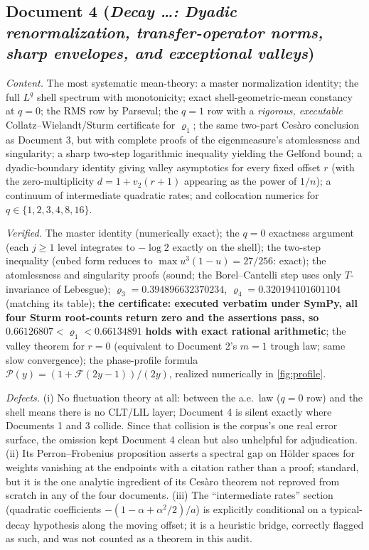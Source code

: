 \documentclass[11pt,oneside]{article}
\theoremstyle{definition}
\theoremstyle{remark}
\newcommand{\vtwo}{v_2}
\begin{document}
\subsection{Document 4 (\emph{Decay \dots: Dyadic renormalization,
transfer-operator norms, sharp envelopes, and exceptional valleys})}

\emph{Content.}  The most systematic mean-theory: a master normalization
identity; the full $L^q$ shell spectrum with monotonicity; exact
shell-geometric-mean constancy at $q=0$; the RMS row by Parseval; the
$q=1$ row with a \emph{rigorous, executable} Collatz--Wielandt/Sturm
certificate for $\varrho_1$; the same two-part Ces\`aro conclusion as
Document 3, but with complete proofs of the eigenmeasure's atomlessness
and singularity; a sharp two-step logarithmic inequality yielding the
Gelfond bound; a dyadic-boundary identity giving valley asymptotics for
every fixed offset $r$ (with the zero-multiplicity $d=1+\vtwo(r+1)$
appearing as the power of $1/n$); a continuum of intermediate quadratic
rates; and collocation numerics for $q\in\{1,2,3,4,8,16\}$.

\emph{Verified.}  The master identity (numerically exact); the $q=0$
exactness argument (each $j\ge1$ level integrates to $-\log2$ exactly on
the shell); the two-step inequality (cubed form reduces to
$\max u^3(1-u)=27/256$: exact); the atomlessness and singularity proofs
(sound; the Borel--Cantelli step uses only $T$-invariance of Lebesgue);
$\varrho_3=0.394896632370234$, $\varrho_4=0.320194101601104$ (matching
its table); \textbf{the certificate: executed verbatim under SymPy,
all four Sturm root-counts return zero and the assertions pass, so}
$0.66126807<\varrho_1<0.66134891$ \textbf{holds with exact rational
arithmetic}; the valley theorem for $r=0$ (equivalent to Document 2's
$m=1$ trough law; same slow convergence); the phase-profile formula
$\mathscr P(y)=(1+\mathscr F(2y-1))/(2y)$, realized numerically in
\cref{fig:profile}.

\emph{Defects.}
(i) No fluctuation theory at all: between the a.e.\ law ($q=0$ row) and
the shell means there is no CLT/LIL layer; Document 4 is silent exactly
where Documents 1 and 3 collide.  Since that collision is the corpus's
one real error surface, the omission kept Document 4 clean but also
unhelpful for adjudication.
(ii) Its Perron--Frobenius proposition asserts a spectral gap on
H\"older spaces for weights vanishing at the endpoints with a citation
rather than a proof; standard, but it is the one analytic ingredient of
its Ces\`aro theorem not reproved from scratch in any of the four
documents.
(iii) The ``intermediate rates'' section (quadratic coefficients
$-(1-\alpha+\alpha^2/2)/a$) is explicitly conditional on a typical-decay
hypothesis along the moving offset; it is a heuristic bridge, correctly
flagged as such, and was not counted as a theorem in this audit.
\end{document}
